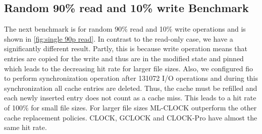 \documentclass[
	12pt,
	a4paper,
	abstract,
	bibliography=totoc,
	chapterprefix,
	headings=openright,
	numbers=endperiod,
	parskip=half,
	twoside,
]{scrreprt}
\begin{document}
\newpage
\subsection{Random 90\% read and 10\% write Benchmark}

The next benchmark is for random 90\% read and 10\% write operations
and is shown in \cref{fig:single 90p read}.
In contrast to the read-only case, we have a significantly different result.
Partly, this is because write operation means that entries are copied for the write and thus are in the modified state and pinned
which leads to the decreasing hit rate for larger file sizes.
Also, we configured fio to perform synchronization operation after 131072 I/O operations and during this 
synchronization all cache entries are deleted.
Thus, the cache must be refilled and each newly inserted entry does not count as a cache miss.
This leads to a hit rate of 100\% for small file sizes.
For larger file sizes ML-CLOCK outperform the other cache replacement policies.
CLOCK, GCLOCK and CLOCK-Pro have almost the same hit rate.
\end{document}
